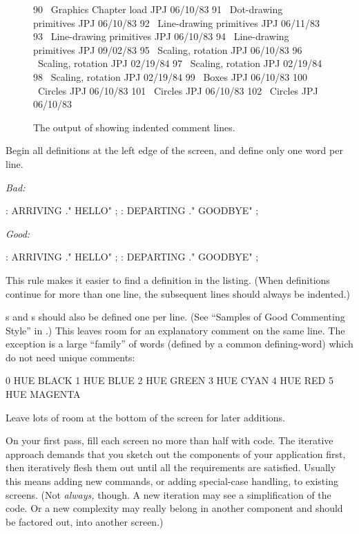 \begin{figure*}[bbbb]
\caption{The output of  showing indented comment lines.}
\begin{Code}
 90 \ Graphics           Chapter load               JPJ 06/10/83
 91    \ Dot-drawing primitives                     JPJ 06/10/83
 92 \ Line-drawing primitives                       JPJ 06/11/83
 93    \ Line-drawing primitives                    JPJ 06/10/83
 94    \ Line-drawing primitives                    JPJ 09/02/83
 95 \ Scaling, rotation                             JPJ 06/10/83
 96    \ Scaling, rotation                          JPJ 02/19/84
 97    \ Scaling, rotation                          JPJ 02/19/84
 98    \ Scaling, rotation                          JPJ 02/19/84
 99 \ Boxes                                         JPJ 06/10/83
100 \ Circles                                       JPJ 06/10/83
101    \ Circles                                    JPJ 06/10/83
102    \ Circles                                    JPJ 06/10/83
\end{Code}
\end{figure*}

\begin{tip}
Begin all definitions at the left edge of the screen, and define only
one word per line.
\end{tip}
\noindent \emph{Bad:}
\begin{Code}
: ARRIVING   ." HELLO" ;   : DEPARTING   ." GOODBYE" ;
\end{Code}
\noindent \emph{Good:}
\begin{Code}
: ARRIVING   ." HELLO" ;
: DEPARTING   ." GOODBYE" ;
\end{Code}
This rule makes it easier to find a definition in the listing.  (When
definitions continue for more than one line, the subsequent lines
should always be indented.)

s and s should also be defined one per
line.  (See ``Samples of Good Commenting Style'' in .) This
leaves room for an explanatory comment on the same line.  The
exception is a large ``family'' of words (defined by a common
defining-word) which do not need unique comments:
\begin{Code}
0 HUE BLACK     1 HUE BLUE      2 HUE GREEN
3 HUE CYAN      4 HUE RED       5 HUE MAGENTA
\end{Code}
\begin{tip}
Leave lots of room at the bottom of the screen for later additions.
\end{tip}
On your first pass, fill each screen no more than half with code.  The
iterative approach demands that you sketch out the components of your
application first, then iteratively flesh them out until all the
requirements are satisfied.  Usually this means adding new commands,
or adding special-case handling, to existing screens.  (Not
\emph{always,} though.  A new iteration may see a simplification of
the code. Or a new complexity may really belong in another component
and should be factored out, into another screen.)

